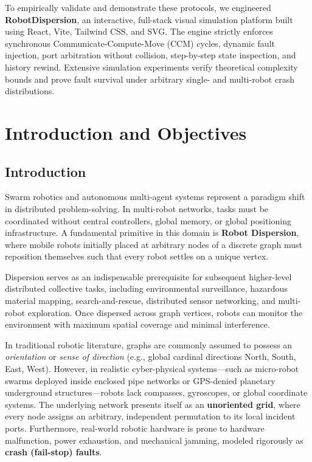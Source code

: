 \documentclass[11pt,a4paper]{report}
\begin{document}
To empirically validate and demonstrate these protocols, we engineered \textbf{RobotDispersion}, an interactive, full-stack visual simulation platform built using React, Vite, Tailwind CSS, and SVG. The engine strictly enforces synchronous Communicate-Compute-Move (CCM) cycles, dynamic fault injection, port arbitration without collision, step-by-step state inspection, and history rewind. Extensive simulation experiments verify theoretical complexity bounds and prove fault survival under arbitrary single- and multi-robot crash distributions.

\newpage
{}

\chapter{Introduction and Objectives}

\section{Introduction}
Swarm robotics and autonomous multi-agent systems represent a paradigm shift in distributed problem-solving. In multi-robot networks, tasks must be coordinated without central controllers, global memory, or global positioning infrastructure. A fundamental primitive in this domain is \textbf{Robot Dispersion}, where mobile robots initially placed at arbitrary nodes of a discrete graph must reposition themselves such that every robot settles on a unique vertex.

Dispersion serves as an indispensable prerequisite for subsequent higher-level distributed collective tasks, including environmental surveillance, hazardous material mapping, search-and-rescue, distributed sensor networking, and multi-robot exploration. Once dispersed across graph vertices, robots can monitor the environment with maximum spatial coverage and minimal interference.

In traditional robotic literature, graphs are commonly assumed to possess an \emph{orientation} or \emph{sense of direction} (e.g., global cardinal directions North, South, East, West). However, in realistic cyber-physical systems---such as micro-robot swarms deployed inside enclosed pipe networks or GPS-denied planetary underground structures---robots lack compasses, gyroscopes, or global coordinate systems. The underlying network presents itself as an \textbf{unoriented grid}, where every node assigns an arbitrary, independent permutation to its local incident ports. Furthermore, real-world robotic hardware is prone to hardware malfunction, power exhaustion, and mechanical jamming, modeled rigorously as \textbf{crash (fail-stop) faults}.
\end{document}
